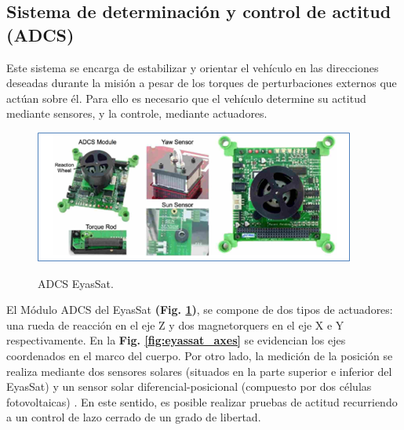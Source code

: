 \subsection{Sistema de determinación y control de actitud (ADCS)}

Este sistema se encarga de estabilizar y orientar el vehículo en las direcciones deseadas durante la misión a pesar de los torques de perturbaciones externos que actúan sobre él. Para ello es necesario que el vehículo determine su actitud mediante sensores, y la controle, mediante actuadores.

\begin{figure}[!ht]
	\begin{center}
		\includegraphics[scale=0.9]{imagenes/marco_teorico/adcs.PNG}\\
	\end{center}
	\caption{ADCS EyasSat.}
	\label{fig:adcs}
\end{figure}

El Módulo ADCS del EyasSat \textbf{(Fig. \ref{fig:adcs})}, se compone de dos tipos de actuadores: una rueda de reacción en el eje Z y dos magnetorquers en el eje X e Y respectivamente. En la \textbf{Fig. \ref{fig:eyassat_axes}} se evidencian los ejes coordenados en el marco del cuerpo.
Por otro lado, la medición de la posición se realiza mediante dos sensores solares (situados en la parte superior e inferior del EyasSat) y un sensor solar diferencial-posicional (compuesto por dos células fotovoltaicas) \cite{Ritchey2004}. En este sentido, es posible realizar pruebas de actitud recurriendo a un control de lazo cerrado de un grado de libertad. 


